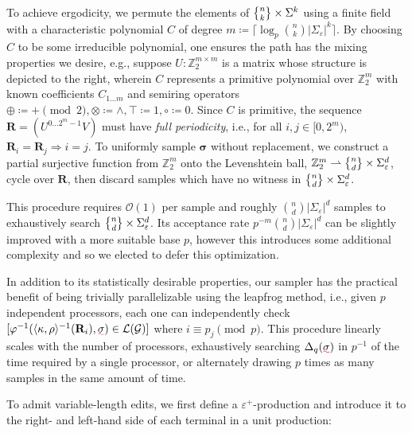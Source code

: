 \documentclass[sigplan,review,anonymous,acmsmall]{acmart}\settopmatter{printfolios=false,printccs=false,printacmref=false}
\begin{document}
To achieve ergodicity, we permute the elements of $\stirlingii{n}{k}\times\Sigma^k$ using a finite field with a characteristic polynomial $C$ of degree $m\coloneqq\lceil \log_p {n \choose k}|\Sigma_\varepsilon|^k \rceil$. By choosing $C$ to be some irreducible polynomial, one ensures the path has the mixing properties we desire, e.g., suppose $U: \mathbb{Z}_2^{m\times m}$ is a matrix whose structure is depicted to the right, wherein $C$ represents a primitive polynomial over $\mathbb{Z}_2^m$ with known coefficients $C_{1\ldots m}$ and semiring operators $\oplus \coloneqq + \pmod 2, \otimes \coloneqq \land, \top \coloneqq 1, \circ\coloneqq0$. Since $C$ is primitive, the sequence $\mathbf{R} = (U^{0 \ldots 2^m-1}V)$ must have \textit{full periodicity}, i.e., for all $i, j \in[0, 2^m)$, ${\mathbf{R}_i = \mathbf{R}_j \Rightarrow i = j}$. To uniformly sample $\bm\sigma$ without replacement, we construct a partial surjective function from $\mathbb{Z}_2^m$ onto the Levenshtein ball, $\mathbb{Z}_2^m\rightharpoonup\stirlingii{n}{d}\times\Sigma_\varepsilon^{d}$, cycle over $\mathbf{R}$, then discard samples which have no witness in $\stirlingii{n}{d}\times\Sigma_\varepsilon^{d}$.

This procedure requires $\mathcal{O}(1)$ per sample and roughly ${n \choose d}|\Sigma_\varepsilon|^{d}$ samples to exhaustively search $\stirlingii{n}{d}\times\Sigma_\varepsilon^{d}$. Its acceptance rate $p^{-m}{n \choose d}|\Sigma_\varepsilon|^{d}$ can be slightly improved with a more suitable base $p$, however this introduces some additional complexity and so we elected to defer this optimization.

In addition to its statistically desirable properties, our sampler has the practical benefit of being trivially parallelizable using the leapfrog method, i.e., given $p$ independent processors, each one can independently check $[\varphi^{-1}(\langle\kappa, \rho\rangle^{-1}(\mathbf{R}_{i}), \err{\sigma}) \in \mathcal{L}(\mathcal{G})]$ where $i \equiv p_j \pmod p$. This procedure linearly scales with the number of processors, exhaustively searching $\Delta_{q}(\err{\sigma})$ in $p^{-1}$ of the time required by a single processor, or alternately drawing $p$ times as many samples in the same amount of time.

To admit variable-length edits, we first define a $\varepsilon^+$-production and introduce it to the right- and left-hand side of each terminal in a unit production:\vspace{5pt}

\end{document}

